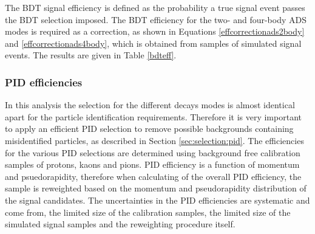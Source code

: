The BDT signal efficiency is defined as the probability a true signal event passes the BDT selection imposed. The BDT efficiency for the two- and four-body ADS modes is required as a correction, as shown in Equations \ref{effcorrectionads2body} and \ref{effcorrectionads4body}, which is obtained from samples of simulated signal events. The results are given in Table \ref{bdteff}.

\begin{table}[h]
\centering
{}
\caption{Summary of the BDT efficiencies used in the \CP fit.}
\label{bdteff}
\end{table}


\subsubsection{PID efficiencies}
\label{sec:cpfit:efficiencies:pid}

In this analysis the selection for the different \Dz decays modes is almost identical apart for the particle identification requirements. Therefore it is very important to apply an efficient PID selection to remove possible backgrounds containing misidentified particles, as described in Section \ref{sec:selection:pid}. The efficiencies for the various PID selections are determined using background free calibration samples of protons, kaons and pions. PID efficiency is a function of momentum and psuedorapidity, therefore when calculating of the overall PID efficiency, the sample is reweighted based on the momentum and pseudorapidity distribution of the signal candidates. The uncertainties in the PID efficiencies are systematic and come from, the limited size of the calibration samples, the limited size of the simulated signal samples and the reweighting procedure itself.

